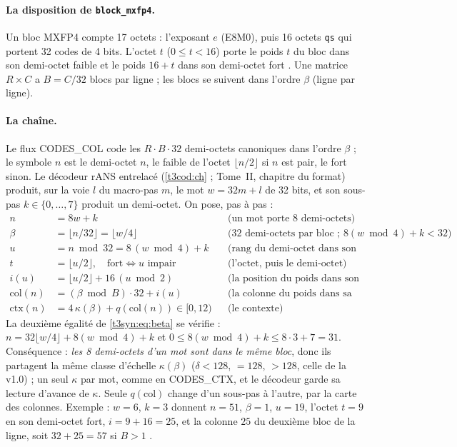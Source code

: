 \paragraph{La disposition de \texttt{block\_mxfp4}.} Un bloc MXFP4 compte 17 octets : l'exposant $e$ (E8M0), puis 16 octets \texttt{qs} qui portent 32 codes de 4 bits. L'octet $t$ ($0 \le t < 16$) porte le poids $t$ du bloc dans son demi-octet faible et le poids $16 + t$ dans son demi-octet fort \parencite{gguf2026,ocpmx2023}. Une matrice $R \times C$ a $B = C/32$ blocs par ligne ; les blocs se suivent dans l'ordre $\beta$ (ligne par ligne).

\paragraph{La chaîne.} Le flux CODES\_COL code les $R \cdot B \cdot 32$ demi-octets canoniques dans l'ordre $\beta$ ; le symbole $n$ est le demi-octet $n$, le faible de l'octet $\lfloor n/2 \rfloor$ si $n$ est pair, le fort sinon. Le décodeur rANS entrelacé (\cref{t3cod:ch} ; Tome~II, chapitre du format) produit, sur la voie $l$ du macro-pas $m$, le mot $w = 32m + l$ de 32 bits, et son sous-pas $k \in \{0, \dots, 7\}$ produit un demi-octet. On pose, pas à pas :
\begin{align}
n &= 8w + k && \text{(un mot porte 8 demi-octets)} \label{t3syn:eq:n}\\
\beta &= \lfloor n/32 \rfloor = \lfloor w/4 \rfloor && \text{(32 demi-octets par bloc ; } 8(w \bmod 4) + k < 32\text{)} \label{t3syn:eq:beta}\\
u &= n \bmod 32 = 8\,(w \bmod 4) + k && \text{(rang du demi-octet dans son bloc)} \label{t3syn:eq:u}\\
t &= \lfloor u/2 \rfloor, \quad \text{fort} \iff u \text{ impair} && \text{(l'octet, puis le demi-octet)} \nonumber\\
i(u) &= \lfloor u/2 \rfloor + 16\,(u \bmod 2) && \text{(la position du poids dans son bloc)} \label{t3syn:eq:i}\\
\mathrm{col}(n) &= (\beta \bmod B)\cdot 32 + i(u) && \text{(la colonne du poids dans sa ligne)} \label{t3syn:eq:col}\\
\mathrm{ctx}(n) &= 4\,\kappa(\beta) + q(\mathrm{col}(n)) \in [0, 12) && \text{(le contexte)} \label{t3syn:eq:ctx}
\end{align}
La deuxième égalité de \eqref{t3syn:eq:beta} se vérifie : $n = 32\lfloor w/4\rfloor + 8(w \bmod 4) + k$ et $0 \le 8(w \bmod 4) + k \le 8 \cdot 3 + 7 = 31$. Conséquence : \emph{les 8 demi-octets d'un mot sont dans le même bloc}, donc ils partagent la même classe d'échelle $\kappa(\beta)$ ($\delta < 128$, $= 128$, $> 128$, celle de la v1.0) ; un seul $\kappa$ par mot, comme en CODES\_CTX, et le décodeur garde sa lecture d'avance de $\kappa$. Seule $q(\mathrm{col})$ change d'un sous-pas à l'autre, par la carte des colonnes. Exemple : $w = 6$, $k = 3$ donnent $n = 51$, $\beta = 1$, $u = 19$, l'octet $t = 9$ en son demi-octet fort, $i = 9 + 16 = 25$, et la colonne $25$ du deuxième bloc de la ligne, soit $32 + 25 = 57$ si $B > 1$ \calc.

